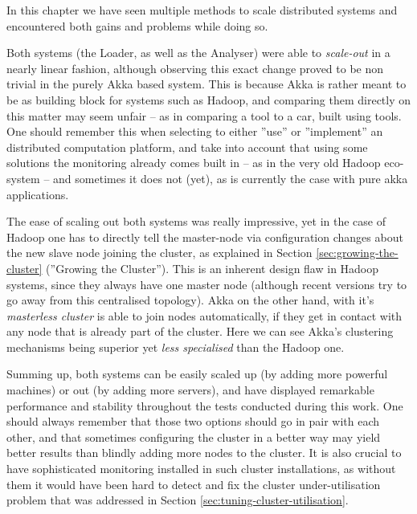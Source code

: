 In this chapter we have seen multiple methods to scale distributed systems and encountered both gains and problems while doing so.

Both systems (the Loader, as well as the Analyser) were able to \textit{scale-out} in a nearly linear fashion, although observing this exact change proved to be non trivial in the purely Akka based system. This is because Akka is rather meant to be as building block for systems such as Hadoop, and comparing them directly on this matter may seem unfair -- as in comparing a tool to a car, built using tools. One should remember this when selecting to either ''use'' or ''implement'' an distributed computation platform, and take into account that using some solutions the monitoring already comes built in -- as in the very old Hadoop eco-system -- and sometimes it does not (yet), as is currently the case with pure akka applications.

The ease of scaling out both systems was really impressive, yet in the case of Hadoop one has to directly tell the master-node via configuration changes about the new slave node joining the cluster, as explained in Section \ref{sec:growing-the-cluster} (''Growing the Cluster''). This is an inherent design flaw in Hadoop systems, since they always have one master node (although recent versions try to go away from this centralised topology). Akka on the other hand, with it's \textit{masterless cluster} is able to join nodes automatically, if they get in contact with any node that is already part of the cluster. Here we can see Akka's clustering mechanisms being superior yet \textit{less specialised} than the Hadoop one.

Summing up, both systems can be easily scaled up (by adding more powerful machines) or out (by adding more servers), and have displayed remarkable performance and stability throughout the tests conducted during this work. One should always remember that those two options should go in pair with each other, and that sometimes configuring the cluster in a better way may yield better results than blindly adding more nodes to the cluster. It is also crucial to have sophisticated monitoring installed in such cluster installations, as without them it would have been hard to detect and fix the cluster under-utilisation problem that was addressed in Section \ref{sec:tuning-cluster-utilisation}.


